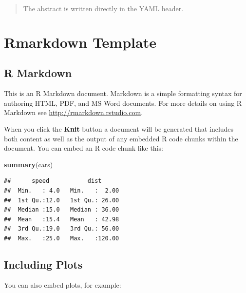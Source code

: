 \documentclass[11pt,a4paper]{article}
\newenvironment{Shaded}{\begin{snugshade}}{\end{snugshade}}
\newcommand{\FunctionTok}[1]{\textcolor[rgb]{0.13,0.29,0.53}{\textbf{#1}}}
\newcommand{\NormalTok}[1]{#1}
\begin{document}
\restoregeometry

\begin{abstract}
The abstract is written directly in the YAML header.
\end{abstract}

{
\hypersetup{linkcolor=black}
\setcounter{tocdepth}{3}
\tableofcontents
}
\newpage
\listoftables
\newpage
\listoffigures
\newpage
{} 
\section{Rmarkdown Template}\label{rmarkdown-template}

\subsection{R Markdown}\label{r-markdown}

This is an R Markdown document. Markdown is a simple formatting syntax
for authoring HTML, PDF, and MS Word documents. For more details on
using R Markdown see \url{http://rmarkdown.rstudio.com}.

When you click the \textbf{Knit} button a document will be generated
that includes both content as well as the output of any embedded R code
chunks within the document. You can embed an R code chunk like this:

\begin{Shaded}
\begin{Highlighting}[]
\FunctionTok{summary}\NormalTok{(cars)}
\end{Highlighting}
\end{Shaded}

\begin{verbatim}
##      speed           dist       
##  Min.   : 4.0   Min.   :  2.00  
##  1st Qu.:12.0   1st Qu.: 26.00  
##  Median :15.0   Median : 36.00  
##  Mean   :15.4   Mean   : 42.98  
##  3rd Qu.:19.0   3rd Qu.: 56.00  
##  Max.   :25.0   Max.   :120.00
\end{verbatim}

\subsection{Including Plots}\label{including-plots}

You can also embed plots, for example:
\end{document}
